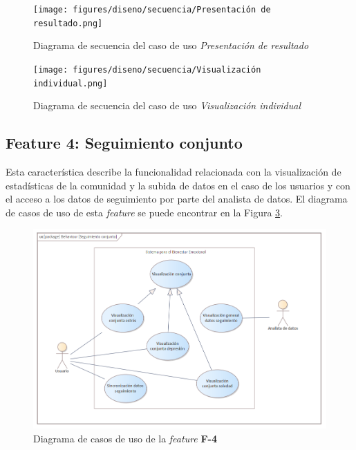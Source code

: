             \begin{figure}[h]
                \centering
                \texttt{[image: figures/diseno/secuencia/Presentación de resultado.png]}
                \caption{Diagrama de secuencia del caso de uso \textit{Presentación de resultado}}
                \label{figure:diagrama_secuencia:presentacion_resultado}
            \end{figure}

            \begin{figure}[h]
                \centering
                \texttt{[image: figures/diseno/secuencia/Visualización individual.png]}
                \caption{Diagrama de secuencia del caso de uso \textit{Visualización individual}}
                \label{figure:diagrama_secuencia:visualizacion_individual}
            \end{figure}
            
            \clearpage  %
            
        \subsection*{Feature 4: Seguimiento conjunto}
            Esta característica describe la funcionalidad relacionada con la visualización de estadísticas de la comunidad y la subida de datos en el caso de los usuarios y con el acceso a los datos de seguimiento por parte del analista de datos. El diagrama de casos de uso de esta \textit{feature} se puede encontrar en la Figura \ref{figure:diagrama_casos_uso:f4}.

            \begin{figure}[h]
                \centering
                \includegraphics[width=1\textwidth]{figures/diseno/casos_uso/Seguimiento conjunto.png}
                \caption{Diagrama de casos de uso de la \textit{feature} \textbf{F-4}}
                \label{figure:diagrama_casos_uso:f4}
            \end{figure}


